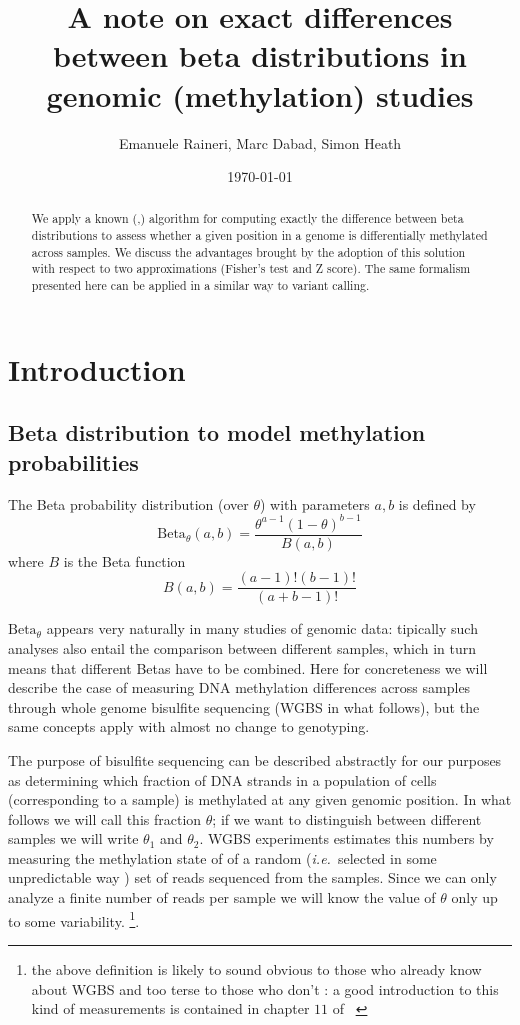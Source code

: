 \documentclass[11pt]{amsart}
\title{A note on exact differences between beta distributions in genomic (methylation) studies}
\author{ Emanuele Raineri, Marc Dabad, Simon Heath }
\date{\today}
\newcommand{\ie}{\textit{i.e.}\ }
\newcommand{\betapdf}{\mbox{Beta}_\theta}
\begin{document}
\begin{abstract}
We apply a known (\cite{exactbetaineq},\cite{numineq}) algorithm for computing exactly the difference between beta distributions
to assess whether a given position in a genome is differentially methylated across
samples. We discuss the advantages brought by the adoption of this solution
with respect to two approximations (Fisher's test and Z score).
The same formalism presented here can be applied in a similar way to variant calling.
\end{abstract}
\maketitle
\section{Introduction}
\subsection{Beta distribution to model methylation probabilities}
The Beta probability distribution (over $\theta$) with parameters $a,b$ is defined by 
\[\betapdf(a,b)=\frac{\theta^{a-1}(1-\theta)^{b-1}}{B(a,b)}\]
where  $B$ is the Beta function 
\[B(a,b)=\frac{(a-1)!(b-1)!}{(a+b-1)!}\]

$\betapdf$ appears very naturally in many studies of genomic data: tipically such analyses also entail the comparison between different samples, which in turn means that different Betas have to be combined. Here for concreteness we will describe the case of measuring DNA methylation differences across samples through whole genome bisulfite sequencing (WGBS in what follows), but the same concepts  apply with almost no change to genotyping. 

The purpose of bisulfite sequencing  can be described abstractly for our purposes as determining which fraction of DNA strands in a population of cells (corresponding to a sample) is methylated at any given genomic position. In what follows we will call this fraction $\theta$; if we want to distinguish between different samples we will write $\theta_1$ and $\theta_2$. WGBS experiments estimates this numbers by measuring the methylation state of of a random (\ie selected in some unpredictable way ) set of reads sequenced from the samples. Since we can only analyze a finite number of reads per sample we will know the value of $\theta$ only up to some variability. 
\footnote{the above definition is likely to sound obvious to those who already know about WGBS and too terse to those who don't : a good introduction to this kind of measurements is contained in chapter $11$ of ~\cite{dna}}.
\end{document}

